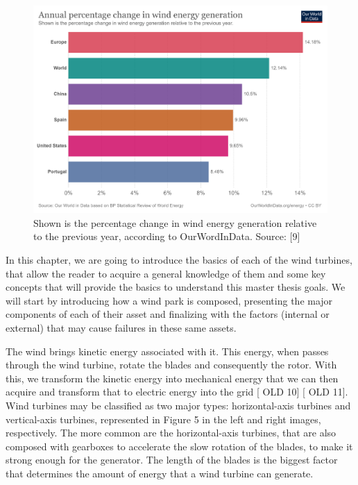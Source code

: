 \begin{figure}[htbp]
	\centering
	\includegraphics[width=\textwidth]{Chapters/Figures/background_fig4.PNG}
	\caption{Shown is the percentage change in wind energy generation relative to the previous year, according to OurWordInData. Source: [9]}
	\label{fig:Figuras_Tree_silhouettes-vectorial}
\end{figure}


In this chapter, we are going to introduce the basics of each of the wind turbines, that allow the reader to acquire a general knowledge of them and some key concepts that will provide the basics to understand this master thesis goals. We will start by introducing how a wind park is composed, presenting the major components of each of their asset and finalizing with the factors (internal or external) that may cause failures in these same assets.


The wind brings kinetic energy associated with it. This energy, when passes through the wind turbine, rotate the blades and consequently the rotor. With this, we transform the kinetic energy into mechanical energy that we can then acquire and transform that to electric energy into the grid [ OLD 10] [ OLD 11].
Wind turbines may be classified as two major types: horizontal-axis turbines and vertical-axis turbines, represented in Figure 5 in the left and right images, respectively. The more common are the horizontal-axis turbines, that are also composed with gearboxes to accelerate the slow rotation of the blades, to make it strong enough for the generator. The length of the blades is the biggest factor that determines the amount of energy that a wind turbine can generate.

